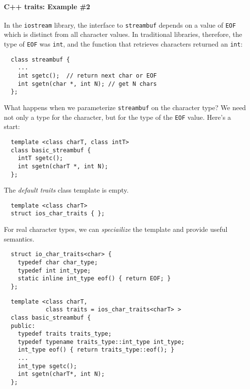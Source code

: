 \documentclass{memo}
\begin{document}
\paragraph{C++ traits: Example \#2}
In the \verb+iostream+ library, the interface to \verb+streambuf+ depends on a
value of \verb+EOF+ which is distinct from all character values. In
traditional libraries, therefore, the type of \verb+EOF+ was \verb+int+, and
the function that retrieves characters returned an \verb+int+:
\begin{verbatim}
  class streambuf {
    ...
    int sgetc();  // return next char or EOF
    int sgetn(char *, int N); // get N chars
  };
\end{verbatim}
What happens when we parameterize \verb+streambuf+ on the character type? We
need not only a type for the character, but for the type of the \verb+EOF+
value. 
Here's a start:
\begin{verbatim}
  template <class charT, class intT>
  class basic_streambuf {
    intT sgetc();
    int sgetn(charT *, int N);
  };
\end{verbatim}

The {\em default traits\/} class template is empty. 
\begin{verbatim}
  template <class charT>
  struct ios_char_traits { };
\end{verbatim}
For real character types, we can {\em speciailize\/} the template and provide
useful semantics.
\begin{verbatim}
  struct io_char_traits<char> {
    typedef char char_type;
    typedef int int_type;
    static inline int_type eof() { return EOF; }
  };
\end{verbatim}

\begin{verbatim}
  template <class charT, 
            class traits = ios_char_traits<charT> > 
  class basic_streambuf {
  public:
    typedef traits traits_type;
    typedef typename traits_type::int_type int_type;
    int_type eof() { return traits_type::eof(); }
    ...
    int_type sgetc();
    int sgetn(charT*, int N);
  };
\end{verbatim}
\end{document}
